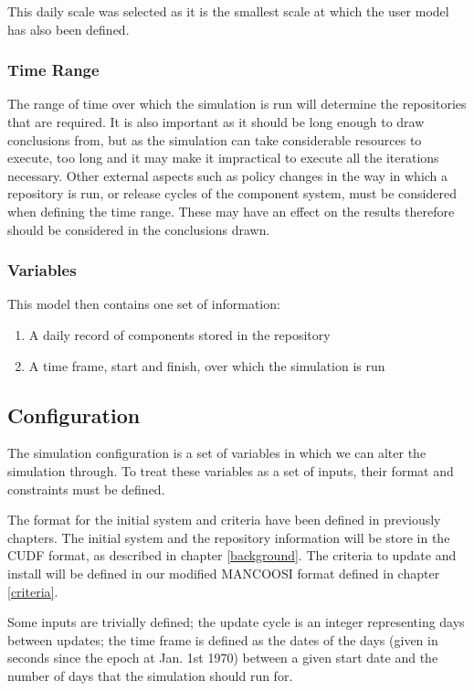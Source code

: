 This daily scale was selected as it is the smallest scale at which the user model has also been defined.

\subsubsection{Time Range}
The range of time over which the simulation is run will determine the repositories that are required.
It is also important as it should be long enough to draw conclusions from,
but as the simulation can take considerable resources to execute, too long and it may make it impractical to execute all the iterations necessary.
Other external aspects such as policy changes in the way in which a repository is run, or release cycles of the component system, 
must be considered when defining the time range.
These may have an effect on the results therefore should be considered in the conclusions drawn.

\subsubsection{Variables}

This model then contains one set of information:
\begin{enumerate}
  \item A daily record of components stored in the repository
  \item A time frame, start and finish, over which the simulation is run
\end{enumerate}

\subsection{Configuration}
The simulation configuration is a set of variables in which we can alter the simulation through.
To treat these variables as a set of inputs, their format and constraints must be defined.

The format for the initial system and criteria have been defined in previously chapters.
The initial system and the repository information will be store in the CUDF format, as described in chapter \ref{background}. 
The criteria to update and install will be defined in our modified MANCOOSI format defined in chapter \ref{criteria}.

Some inputs are trivially defined;
the update cycle is an integer representing days between updates;
the time frame is defined as the dates of the days (given in seconds since the epoch at Jan. 1st 1970) between a given start date and the number of days that the simulation should run for.


